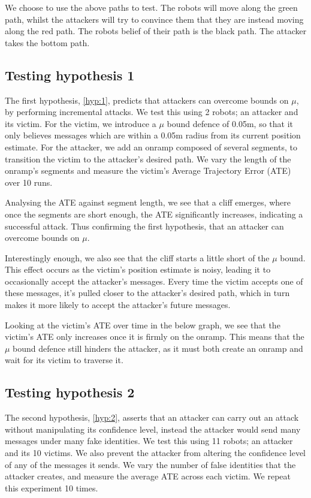 We choose to use the above paths to test. The robots will move along the green path, whilst the attackers will try to convince them that they are instead moving along the red path. The robots belief of their path is the black path. The attacker takes the bottom path.


\subsection{Testing hypothesis 1}
The first hypothesis, \ref{hyp:1}, predicts that attackers can overcome bounds on $\mu$, by performing incremental attacks. We test this using 2 robots; an attacker and its victim. For the victim, we introduce a $\mu$ bound defence of 0.05m, so that it only believes messages which are within a 0.05m radius from its current position estimate. For the attacker, we add an onramp composed of several segments, to transition the victim to the attacker's desired path. We vary the length of the onramp's segments and measure the victim's Average Trajectory Error (ATE) over 10 runs.


Analysing the ATE against segment length, we see that a cliff emerges, where once the segments are short enough, the ATE significantly increases, indicating a successful attack. Thus confirming the first hypothesis, that an attacker can overcome bounds on $\mu$.


Interestingly enough, we also see that the cliff starts a little short of the $\mu$ bound. This effect occurs as the victim's position estimate is noisy, leading it to occasionally accept the attacker's messages. Every time the victim accepts one of these messages, it's pulled closer to the attacker's desired path, which in turn makes it more likely to accept the attacker's future messages.

Looking at the victim's ATE over time in the below graph, we see that the victim's ATE only increases once it is firmly on the onramp. This means that the $\mu$ bound defence still hinders the attacker, as it must both create an onramp and wait for its victim to traverse it.


\subsection{Testing hypothesis 2}
The second hypothesis, \ref{hyp:2}, asserts that an attacker can carry out an attack without manipulating its confidence level, instead the attacker would send many messages under many fake identities. We test this using 11 robots; an attacker and its 10 victims. We also prevent the attacker from altering the confidence level of any of the messages it sends. We vary the number of false identities that the attacker creates, and measure the average ATE across each victim. We repeat this experiment 10 times.

